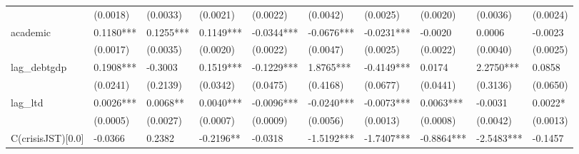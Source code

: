 \begin{table}
\begin{center}
\begin{tabular}{llllllllll}
                         & (0.0018)               & (0.0033)                & (0.0021)                 & (0.0022)                    & (0.0042)                     & (0.0025)                      & (0.0020)                   & (0.0036)                    & (0.0024)                      \\
academic                 & 0.1180***              & 0.1255***               & 0.1149***                & -0.0344***                  & -0.0676***                   & -0.0231***                    & -0.0020                    & 0.0006                      & -0.0023                       \\
                         & (0.0017)               & (0.0035)                & (0.0020)                 & (0.0022)                    & (0.0047)                     & (0.0025)                      & (0.0022)                   & (0.0040)                    & (0.0025)                      \\
lag\_debtgdp             & 0.1908***              & -0.3003                 & 0.1519***                & -0.1229***                  & 1.8765***                    & -0.4149***                    & 0.0174                     & 2.2750***                   & 0.0858                        \\
                         & (0.0241)               & (0.2139)                & (0.0342)                 & (0.0475)                    & (0.4168)                     & (0.0677)                      & (0.0441)                   & (0.3136)                    & (0.0650)                      \\
lag\_ltd                 & 0.0026***              & 0.0068**                & 0.0040***                & -0.0096***                  & -0.0240***                   & -0.0073***                    & 0.0063***                  & -0.0031                     & 0.0022*                       \\
                         & (0.0005)               & (0.0027)                & (0.0007)                 & (0.0009)                    & (0.0056)                     & (0.0013)                      & (0.0008)                   & (0.0042)                    & (0.0013)                      \\
C(crisisJST)[0.0]        & -0.0366                & 0.2382                  & -0.2196**                & -0.0318                     & -1.5192***                   & -1.7407***                    & -0.8864***                 & -2.5483***                  & -0.1457                       \\

\end{tabular}
\end{center}
\end{table}
